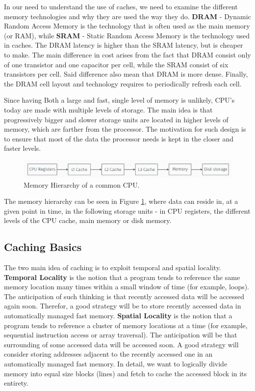 In our need to understand the use of caches, we need to examine the different memory technologies and why they are used the way they do. \textbf{DRAM} - Dynamic Random Access Memory is the technology that is often used as the main memory (or RAM), while \textbf{SRAM} - Static Random Access Memory is the technology used in caches. The DRAM latency is higher than the SRAM latency, but is cheaper to make. The main difference in cost arises from the fact that DRAM consist only of one transistor and one capacitor per cell, while the SRAM consist of six transistors per cell. Said difference also mean that DRAM is more dense. Finally, the DRAM cell layout and technology requires to periodically refresh each cell.

Since having Both a large and fast, single level of memory is unlikely, CPU's today are made with multiple levels of storage. The main idea is that progressively bigger and slower storage units are located in higher levels of memory, which are farther from the processor. The motivation for such design is to ensure that most of the data the processor needs is kept in the closer and faster levels.

\begin{figure}
    \centering
    \includegraphics[width=\textwidth]{images/MemHier.PNG}
    \caption{Memory Hierarchy of a common CPU.}
    \label{fig:MemHier}
\end{figure}

The memory hierarchy can be seen in Figure \ref{fig:MemHier}, where data can reside in, at a given point in time, in the following storage units - in CPU registers, the different levels of the CPU cache, main memory or disk memory. 

\subsection{Caching Basics} The two main idea of caching is to exploit temporal and spatial locality. \textbf{Temporal Locality} is the notion that a program tends to reference the same memory location many times within a small window of time (for example, loops). The anticipation of such thinking is that recently accessed data will be accessed again soon. Therefor, a good strategy will be to store recently accessed data in automatically managed fast memory. \textbf{Spatial Locality} is the notion that a program tends to reference a cluster of memory locations at a time (for example, sequential instruction access or array traversal). The anticipation will be that surrounding of some accessed data will be accessed soon. A good strategy will consider storing addresses adjacent to the recently accessed one in an automatically managed fast memory. In detail, we want to logically divide memory into equal size blocks (lines) and fetch to cache the accessed block in its entirety.   

